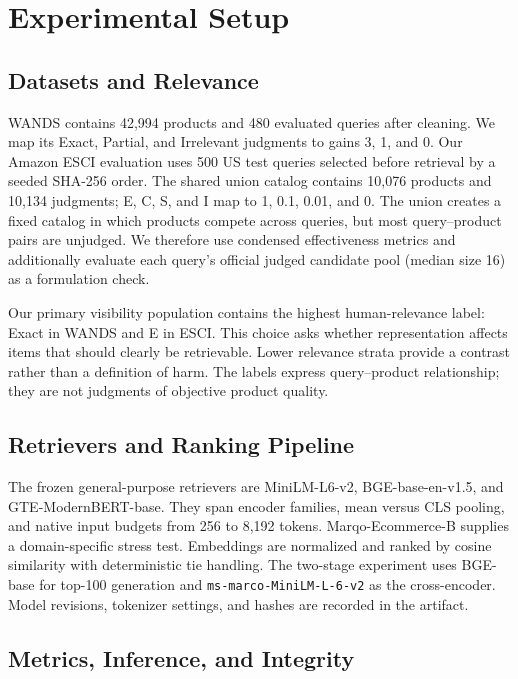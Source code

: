 \section{Experimental Setup}

\subsection{Datasets and Relevance}

WANDS contains 42,994 products and 480 evaluated queries after cleaning. We map its Exact, Partial, and Irrelevant judgments to gains 3, 1, and 0. Our Amazon ESCI evaluation uses 500 US test queries selected before retrieval by a seeded SHA-256 order. The shared union catalog contains 10,076 products and 10,134 judgments; E, C, S, and I map to 1, 0.1, 0.01, and 0. The union creates a fixed catalog in which products compete across queries, but most query--product pairs are unjudged. We therefore use condensed effectiveness metrics and additionally evaluate each query's official judged candidate pool (median size 16) as a formulation check.

Our primary visibility population contains the highest human-relevance label: Exact in WANDS and E in ESCI. This choice asks whether representation affects items that should clearly be retrievable. Lower relevance strata provide a contrast rather than a definition of harm. The labels express query--product relationship; they are not judgments of objective product quality.

\subsection{Retrievers and Ranking Pipeline}

The frozen general-purpose retrievers are MiniLM-L6-v2, BGE-base-en-v1.5, and GTE-ModernBERT-base. They span encoder families, mean versus CLS pooling, and native input budgets from 256 to 8,192 tokens. Marqo-Ecommerce-B supplies a domain-specific stress test. Embeddings are normalized and ranked by cosine similarity with deterministic tie handling. The two-stage experiment uses BGE-base for top-100 generation and \texttt{ms-marco-MiniLM-L-6-v2} as the cross-encoder. Model revisions, tokenizer settings, and hashes are recorded in the artifact.

\subsection{Metrics, Inference, and Integrity}

